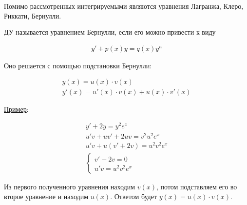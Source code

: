 \begin{remark}
  Помимо рассмотренных интегрируемыми являются уравнения Лагранжа, Клеро,
  Риккати, Бернулли. 
\end{remark}

\begin{definition}
  ДУ называется уравнением Бернулли, если его можно привести к виду   

  \begin{align*}
    y' + p(x) y = q(x) y^{n}
  \end{align*}

  Оно решается с помощью  подстановки Бернулли:

  \begin{align*}
    y(x) = u(x) \cdot v(x) \\
    y'(x) = u'(x) \cdot v(x) + u(x) \cdot v'(x)
  \end{align*}
\end{definition}

\underline{Пример}:

\begin{align*}
  y' + 2 y = y^2 e^x \\
  u' v + u v' + 2 u v = v^2 u^2 e^x \\
  u' v + u(v'+ 2v) = u^2v^2e^x \\
  \begin{cases}
    v' + 2v = 0 \\
    u'v = u^2 v^2 e^x
  \end{cases}
\end{align*}

Из первого полученного уравнения находим \(v(x)\), потом подставляем его во
второе уравнение и находим \(u(x)\). Ответом будет \(y(x) = u(x) \cdot v(x)\).
